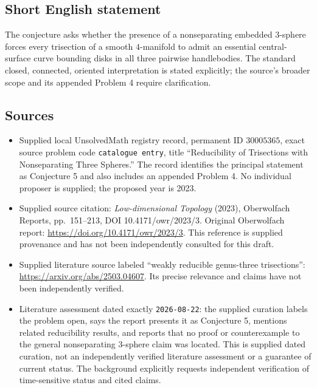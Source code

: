 \documentclass[11pt]{article}
\begin{document}
\subsection{Short English statement}
The conjecture asks whether the presence of a nonseparating embedded \(3\)-sphere forces every trisection of a smooth \(4\)-manifold to admit an essential central-surface curve bounding disks in all three pairwise handlebodies. The standard closed, connected, oriented interpretation is stated explicitly; the source's broader scope and its appended Problem 4 require clarification.
\subsection{Sources}
\begin{itemize}
\item Supplied local UnsolvedMath registry record, permanent ID \(30005365\), exact source problem code \texttt{catalogue entry}, title ``Reducibility of Trisections with Nonseparating Three Spheres.'' The record identifies the principal statement as Conjecture 5 and also includes an appended Problem 4. No individual proposer is supplied; the proposed year is 2023.
\item Supplied source citation: \emph{Low-dimensional Topology} (2023), Oberwolfach Reports, pp.~151--213, DOI 10.4171/owr/2023/3. Original Oberwolfach report: \url{https://doi.org/10.4171/owr/2023/3}. This reference is supplied provenance and has not been independently consulted for this draft.
\item Supplied literature source labeled ``weakly reducible genus-three trisections'': \url{https://arxiv.org/abs/2503.04607}. Its precise relevance and claims have not been independently verified.
\item Literature assessment dated exactly \texttt{2026-08-22}: the supplied curation labels the problem open, says the report presents it as Conjecture 5, mentions related reducibility results, and reports that no proof or counterexample to the general nonseparating \(3\)-sphere claim was located. This is supplied dated curation, not an independently verified literature assessment or a guarantee of current status. The background explicitly requests independent verification of time-sensitive status and cited claims.
\end{itemize}
\end{document}
